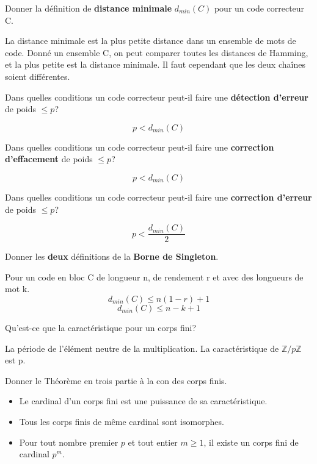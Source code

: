 \documentclass[12pt]{article}
\newcommand*{\xfield}[1]{\begin{mdframed}\centering #1\end{mdframed}\bigskip}
\newenvironment{note}{}{}
\begin{document}
\begin{note}
\xfield{Donner la définition de \textbf{distance minimale} $d_{min}(C)$ pour un code correcteur C.}
\xfield{La distance minimale est la plus petite distance dans un ensemble de mots de code. Donné un ensemble C, on peut comparer toutes les distances de Hamming, et la plus petite est la distance minimale. Il faut cependant que les deux chaînes soient différentes.}
\end{note}

\begin{note}
\xfield{Dans quelles conditions un code correcteur peut-il faire une \textbf{détection d'erreur} de poids $\leq p$?}
\xfield{$$p < d_{min}(C)$$}
\end{note}

\begin{note}
\xfield{Dans quelles conditions un code correcteur peut-il faire une \textbf{correction d'effacement} de poids $\leq p$?}
\xfield{$$p < d_{min}(C)$$}
\end{note}

\begin{note}
\xfield{Dans quelles conditions un code correcteur peut-il faire une \textbf{correction d'erreur} de poids $\leq p$?}
\xfield{$$p < \frac{d_{min}(C)}{2}$$}
\end{note}

\begin{note}
\xfield{Donner les \textbf{deux} définitions de la \textbf{Borne de Singleton}. }
\xfield{
Pour un code en bloc C de longueur n, de rendement r et avec des longueurs de mot k.
$$d_{min}(C) \leq n(1-r) + 1$$
$$d_{min}(C) \leq n-k+1$$
}
\end{note}

\begin{note}
\xfield{Qu'est-ce que la caractéristique pour un corps fini?}
\xfield{La période de l'élément neutre de la multiplication. La caractéristique de ${\mathbb{Z}}/{p\mathbb{Z}}$ est p.}
\end{note}

\begin{note}
\xfield{Donner le Théorème en trois partie à la con des corps finis.}
\xfield{
\begin{itemize}
\item Le cardinal d'un corps fini est une puissance de sa caractéristique.
\item Tous les corps finis de même cardinal sont isomorphes.
\item Pour tout nombre premier $p$ et tout entier $m \geq 1$, il existe un corps fini de  cardinal $p^m$.
\end{itemize}
}
\end{note}
\end{document}
